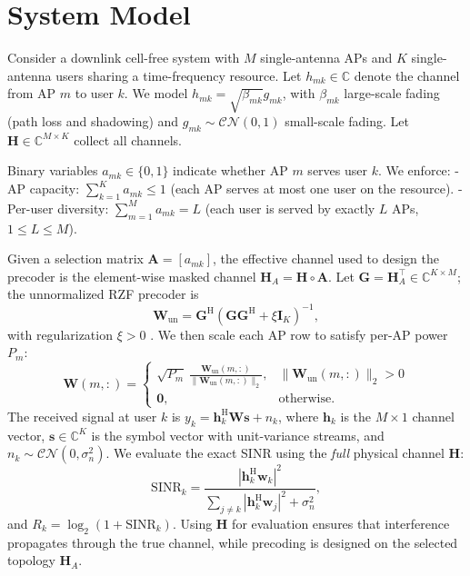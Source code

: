 {\section{System Model}
Consider a downlink cell-free system with $M$ single-antenna APs and $K$ single-antenna users sharing a time-frequency resource. Let $h_{mk}\in\mathbb{C}$ denote the channel from AP $m$ to user $k$. We model $h_{mk}=\sqrt{\beta_{mk}} g_{mk}$, with $\beta_{mk}$ large-scale fading (path loss and shadowing) and $g_{mk}\sim \mathcal{CN}(0,1)$ small-scale fading. Let $\mathbf{H}\in \mathbb{C}^{M\times K}$ collect all channels.

Binary variables $a_{mk}\in\{0,1\}$ indicate whether AP $m$ serves user $k$. We enforce:
- AP capacity: $\sum_{k=1}^K a_{mk}\le 1$ (each AP serves at most one user on the resource).
- Per-user diversity: $\sum_{m=1}^M a_{mk}=L$ (each user is served by exactly $L$ APs, $1\le L\le M$).

Given a selection matrix $\mathbf{A}=[a_{mk}]$, the effective channel used to design the precoder is the element-wise masked channel $\mathbf{H}_A=\mathbf{H}\circ \mathbf{A}$. Let $\mathbf{G}=\mathbf{H}_A^\top\in \mathbb{C}^{K\times M}$; the unnormalized RZF precoder is
\begin{equation}
\mathbf{W}_{\mathrm{un}}=\mathbf{G}^\mathrm{H}\left(\mathbf{G}\mathbf{G}^\mathrm{H}+\xi \mathbf{I}_K\right)^{-1},
\end{equation}
with regularization $\xi>0$ \cite{peel2005vector}. We then scale each AP row to satisfy per-AP power $P_m$:
\begin{equation}
\mathbf{W}(m,:)=
\begin{cases}
\sqrt{P_m}\,\frac{\mathbf{W}_{\mathrm{un}}(m,:)}{\|\mathbf{W}_{\mathrm{un}}(m,:)\|_2}, & \|\mathbf{W}_{\mathrm{un}}(m,:)\|_2>0\\
\mathbf{0}, & \text{otherwise}.
\end{cases}
\end{equation}
The received signal at user $k$ is $y_k=\mathbf{h}_k^\mathrm{H}\mathbf{W}\mathbf{s}+n_k$, where $\mathbf{h}_k$ is the $M\times 1$ channel vector, $\mathbf{s}\in\mathbb{C}^{K}$ is the symbol vector with unit-variance streams, and $n_k\sim\mathcal{CN}(0,\sigma_n^2)$. We evaluate the exact SINR using the \emph{full} physical channel $\mathbf{H}$:
\begin{equation}
\mathrm{SINR}_k=\frac{|\mathbf{h}_k^\mathrm{H}\mathbf{w}_k|^2}{\sum_{j\neq k}|\mathbf{h}_k^\mathrm{H}\mathbf{w}_j|^2+\sigma_n^2},

\end{equation}
and $R_k=\log_2(1+\mathrm{SINR}_k)$. Using $\mathbf{H}$ for evaluation ensures that interference propagates through the true channel, while precoding is designed on the selected topology $\mathbf{H}_A$.

}
